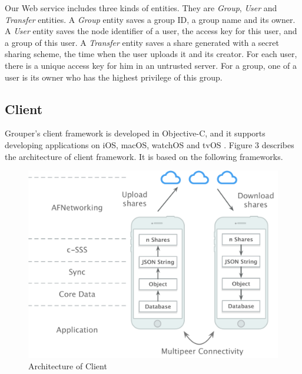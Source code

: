 \documentclass[twocolumn,10pt]{article}
\begin{document}
Our Web service includes three kinds of entities. 
They are \emph{Group}, \emph{User} and \emph{Transfer} entities. 
A \emph{Group} entity saves a group ID, a group name and its owner. 
A \emph{User} entity saves the node identifier of a user, the access key for this user, and a group of this user. 
A \emph{Transfer} entity saves a share generated with a secret sharing scheme, the time when the user uploads it and its creator. 
For each user, there is a unique access key for him in an untrusted server. For a group, one of a user is its owner who has the highest privilege of this group.

\subsection{Client}

Grouper's client framework is developed in Objective-C, and it supports developing applications on iOS, macOS, watchOS and tvOS . 
Figure 3 describes the architecture of client framework. It is based on the following frameworks.   

\begin{figure}[t]
	\centering
	\includegraphics[scale=0.35]{architecture}
	\caption{Architecture of Client}
\end{figure}
\end{document}
